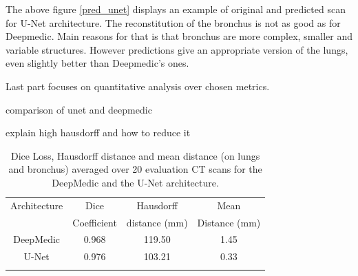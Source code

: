 The above figure \ref{pred_unet} displays an example of original and predicted scan for U-Net architecture. The reconstitution of the bronchus is not as good as for Deepmedic. Main reasons for that is that bronchus are more complex, smaller and variable structures. However predictions give an appropriate version of the lungs, even slightly better than Deepmedic's ones.\newline\newline

Last part focuses on quantitative analysis over chosen metrics.




comparison of unet and deepmedic

explain high hausdorff and how to reduce it


\begin{table}[h!]
	\caption{Dice Loss, Hausdorff distance and mean distance (on lungs and bronchus) averaged over 20 evaluation CT scans for the DeepMedic and the U-Net architecture.}
	\label{table_result}
	\centering
	\setlength{\tabcolsep}{10pt}
	\renewcommand{\arraystretch}{1.5}
	\begin{tabular}{c c c c}
		\hline 
		Architecture & Dice & Hausdorff & Mean \\
		& Coefficient & distance (mm) & Distance (mm) \\ 
		\hline 
		DeepMedic & 0.968 & 119.50 & 1.45 \\ 
		U-Net & 0.976 & 103.21 & 0.33 \\ 
		\hline
		\newline 
	\end{tabular}

\end{table}
